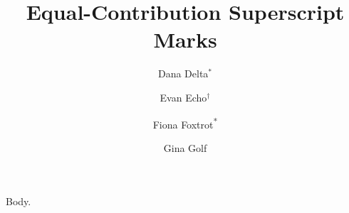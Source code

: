 \documentclass{article}
\title{Equal-Contribution Superscript Marks}
\author{Dana Delta$^{*}$ \and Evan Echo$^{\dagger}$ \and Fiona Foxtrot\textsuperscript{*} \and Gina Golf}
\begin{document}
\maketitle
Body.
\end{document}
